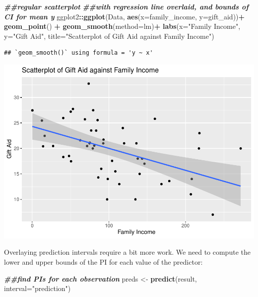 \documentclass[
]{book}
\newenvironment{Shaded}{\begin{snugshade}}{\end{snugshade}}
\newcommand{\AttributeTok}[1]{\textcolor[rgb]{0.13,0.29,0.53}{#1}}
\newcommand{\DocumentationTok}[1]{\textcolor[rgb]{0.56,0.35,0.01}{\textbf{\textit{#1}}}}
\newcommand{\FunctionTok}[1]{\textcolor[rgb]{0.13,0.29,0.53}{\textbf{#1}}}
\newcommand{\NormalTok}[1]{#1}
\newcommand{\OtherTok}[1]{\textcolor[rgb]{0.56,0.35,0.01}{#1}}
\newcommand{\SpecialCharTok}[1]{\textcolor[rgb]{0.81,0.36,0.00}{\textbf{#1}}}
\newcommand{\StringTok}[1]{\textcolor[rgb]{0.31,0.60,0.02}{#1}}
\begin{document}
\begin{Shaded}
\begin{Highlighting}[]
\DocumentationTok{\#\#regular scatterplot}
\DocumentationTok{\#\#with regression line overlaid, and bounds of CI for mean y}
\NormalTok{ggplot2}\SpecialCharTok{::}\FunctionTok{ggplot}\NormalTok{(Data, }\FunctionTok{aes}\NormalTok{(}\AttributeTok{x=}\NormalTok{family\_income, }\AttributeTok{y=}\NormalTok{gift\_aid))}\SpecialCharTok{+}
  \FunctionTok{geom\_point}\NormalTok{() }\SpecialCharTok{+}
  \FunctionTok{geom\_smooth}\NormalTok{(}\AttributeTok{method=}\NormalTok{lm)}\SpecialCharTok{+}
  \FunctionTok{labs}\NormalTok{(}\AttributeTok{x=}\StringTok{"Family Income"}\NormalTok{, }
       \AttributeTok{y=}\StringTok{"Gift Aid"}\NormalTok{, }
       \AttributeTok{title=}\StringTok{"Scatterplot of Gift Aid against Family Income"}\NormalTok{)}
\end{Highlighting}
\end{Shaded}

\begin{verbatim}
## `geom_smooth()` using formula = 'y ~ x'
\end{verbatim}

\includegraphics{bookdown-demo_files/figure-latex/unnamed-chunk-41-1.pdf}

Overlaying prediction intervals require a bit more work. We need to compute the lower and upper bounds of the PI for each value of the predictor:

\begin{Shaded}
\begin{Highlighting}[]
\DocumentationTok{\#\#find PIs for each observation}
\NormalTok{preds }\OtherTok{\textless{}{-}} \FunctionTok{predict}\NormalTok{(result, }\AttributeTok{interval=}\StringTok{"prediction"}\NormalTok{)}
\end{Highlighting}
\end{Shaded}
\end{document}
